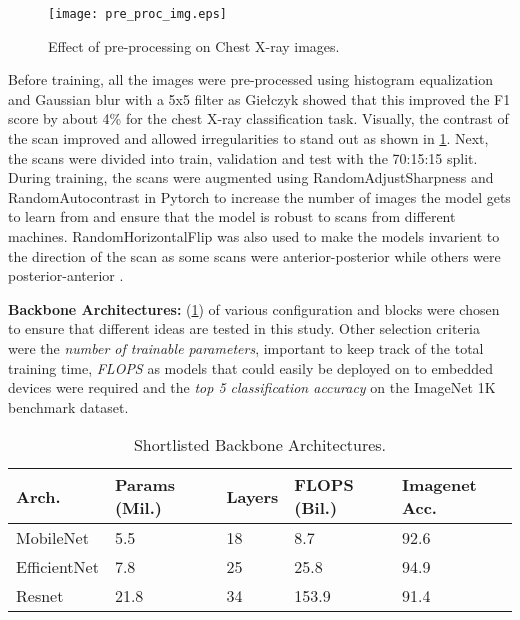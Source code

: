 \documentclass[10pt,twocolumn,letterpaper]{article}
\begin{document}
\begin{figure}[t]
  \centering
  \texttt{[image: pre\_proc\_img.eps]}  
   \caption{Effect of pre-processing on Chest X-ray images.}
   \label{fig:pre_proc_img}
\end{figure}

Before training, all the images were pre-processed using histogram equalization and Gaussian blur 
with a 5x5 filter as Giełczyk \etal \cite{gielczyk2022pre} showed that this improved the 
F1 score by about 4\% for the chest X-ray classification task. Visually, the contrast of the scan improved 
and allowed irregularities to stand out as shown in \cref{fig:pre_proc_img}. Next, the 
scans were divided into train, validation and test with the 70:15:15 split. 
During training, the scans were augmented using RandomAdjustSharpness and 
RandomAutocontrast \cite{nanni2021comparison} in Pytorch \cite{transforms} to increase the number of images the 
model gets to learn from and ensure that the model is robust to scans from different machines.
RandomHorizontalFlip was also used to make the models invarient to the direction of the scan as 
some scans were anterior-posterior while others were posterior-anterior \cite{botev2022regularising}.

\textbf{Backbone Architectures:} (\cref{tab:selArch}) of various configuration and blocks were chosen 
to ensure that different ideas are tested in this study. 
Other selection criteria were the \textit{number of trainable parameters}, important to keep track of 
the total training time, \textit{FLOPS} as models that could easily be 
deployed on to embedded devices were required and the \textit{top 5 classification accuracy} on the ImageNet 
1K benchmark dataset.

\begin{table}
  \centering
  \begin{tabular}{p{1.7cm}|p{1cm}|p{1cm}|p{1cm}|p{1cm}}
  \toprule
  Arch. & Params (Mil.) & Layers & FLOPS (Bil.) & Imagenet Acc.\\
  \midrule
  MobileNet & 5.5 & 18 & 8.7 & 92.6\\
  \midrule
  EfficientNet & 7.8 & 25 & 25.8 & 94.9\\
  \midrule
  Resnet & 21.8 & 34 & 153.9 & 91.4\\
  \bottomrule
  \end{tabular}
  \caption{Shortlisted Backbone Architectures.}
  \label{tab:selArch}
\end{table}
\end{document}
